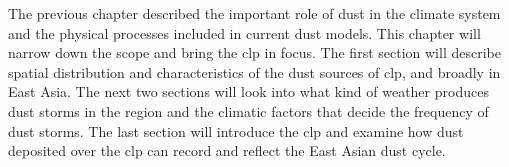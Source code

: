 \label{chap:east_asia_dust}
The previous chapter described the important role of dust in the climate system and the physical processes included in current dust models. This chapter will narrow down the scope and bring the \acrshort{clp} in focus. 
The first section will describe spatial distribution and characteristics of the dust sources of \acrshort{clp}, and broadly in East Asia. The next two sections  will look into what kind of weather produces dust storms in the region and the climatic factors that decide the frequency of dust storms. The last section will introduce the \acrshort{clp} and examine how dust deposited over the \acrshort{clp} can record and reflect the East Asian dust cycle.  

